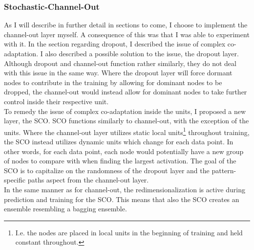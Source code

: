 \subsubsection*{Stochastic-Channel-Out}\label{subsubsec:stochchannelout}
As I will describe in further detail in sections to come, I choose to implement the channel-out layer myself. A consequence of this 
was that I was able to experiment with it. In the section regarding dropout, I described the issue of complex co-adaptation. I also described 
a possible solution to the issue, the dropout layer. Although dropout and channel-out function rather similarly, they do not deal 
with this issue in the same way. Where the dropout layer will force dormant nodes to contribute in the training by allowing for dominant
nodes to be dropped, the channel-out would instead allow for dominant nodes to take further control inside their respective unit.
\\
To remedy the issue of complex co-adaptation inside the units, I proposed a new layer, the \acf{SCO}. \ac{SCO} functions similarly to channel-out, 
with the exception of the units. Where the channel-out layer utilizes static local units\footnote{I.e. the nodes are placed in local units in the beginning of 
training and held constant throughout.} throughout training, the \ac{SCO} instead utilizes dynamic units which change for each data point. In other words, 
for each data point, each node would potentially have a new group of nodes to compare with when finding the largest activation.
The goal of the \ac{SCO} is to capitalize on the randomness of the dropout layer and the pattern-specific paths aspect from the 
channel-out layer.
\\  
In the same manner as for channel-out, the redimensionalization is active during prediction and training for the \ac{SCO}. This 
means that also the \ac{SCO} creates an ensemble resembling a bagging ensemble.

